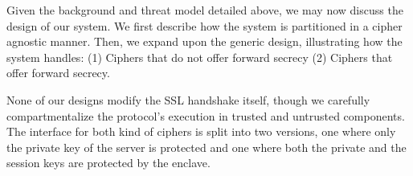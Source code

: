 \documentclass[../../main.tex]{subfiles}
\begin{document}
Given the background and threat model detailed above, we may now
discuss the design of our system. We first describe how the system is
partitioned in a cipher agnostic manner. Then, we expand upon the
generic design, illustrating how the system handles: (1) Ciphers that
do not offer forward secrecy (2) Ciphers that offer forward secrecy.


None of our designs modify the SSL handshake itself, though we carefully
compartmentalize the protocol's execution in trusted and untrusted
components. The interface for both kind of ciphers is split into two
versions, one where only the private key of the server is protected
and one where both the private and the session keys are protected by
the enclave.
\end{document}
